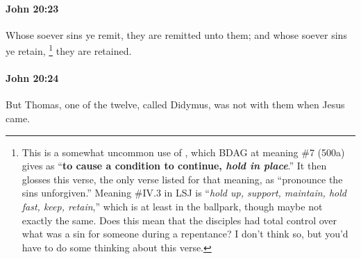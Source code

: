		\paragraph{John 20:23} %
			\label{JOHN-20-23}

			Whose soever sins ye remit, they are remitted unto them; and whose soever sins ye retain,%
				\footnote{%
					This is a somewhat uncommon use of , which BDAG at meaning \#7 (500a) gives as ``\textbf{to cause a condition to continue, \textit{hold in place}}.'' It then glosses this verse, the only verse listed for that meaning, as ``pronounce the sins unforgiven.'' Meaning \#IV.3 in LSJ is ``\textit{hold up, support, maintain, hold fast, keep, retain},'' which is at least in the ballpark, though maybe not exactly the same. Does this mean that the disciples had total control over what was a sin for someone during a repentance? I don't think so, but you'd have to do some thinking about this verse.
					}
			they are retained.

			\begin{framed}
				\scriptsize
				\begin{compactdesc}
					\item[SBLG] 
				\end{compactdesc}
			\end{framed}

		\paragraph{John 20:24} %
			\label{JOHN-20-24}

			But Thomas, one of the twelve, called Didymus, was not with them when Jesus came.

